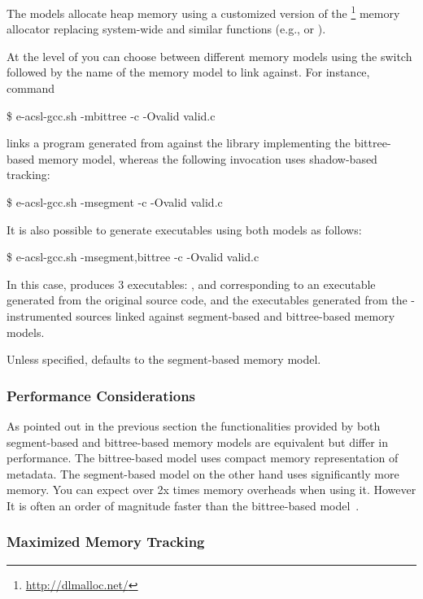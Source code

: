 The \eacsl models allocate heap memory using a customized version of the
\dlmalloc\footnote{\url{http://dlmalloc.net/}} memory allocator replacing
system-wide  and similar functions (e.g.,  or ).

At the level of \eacslgcc you can choose between different memory models using
the  switch followed by the name of the memory model to link
against.  For instance, command
\begin{logs}
\$ e-acsl-gcc.sh -mbittree -c -Ovalid valid.c
\end{logs}
links a program generated from  against the library implementing the
bittree-based memory model, whereas the following invocation uses shadow-based
tracking:
\begin{logs}
\$ e-acsl-gcc.sh -msegment -c -Ovalid valid.c
\end{logs}
It is also possible to generate executables using both models as follows:
\begin{logs}
\$ e-acsl-gcc.sh -msegment,bittree -c -Ovalid valid.c
\end{logs}
In this case, \eacslgcc produces 3 executables: ,
 and  corresponding to an
executable generated from the original source code, and the executables
generated from the \eacsl-instrumented sources linked against
segment-based and bittree-based memory models.

Unless specified, \eacsl defaults to the segment-based memory model.

\subsubsection{Performance Considerations}
\label{sec:perf}

As pointed out in the previous section the functionalities provided by both
segment-based and bittree-based memory models are equivalent but differ in
performance. The bittree-based model uses compact memory representation of
metadata. The segment-based model on the other hand uses significantly more
memory. You can expect over 2x times memory overheads when using it. However It
is often an order of magnitude faster than the bittree-based
model~\cite{vorobyov17ismm}.


\subsubsection{Maximized Memory Tracking}

